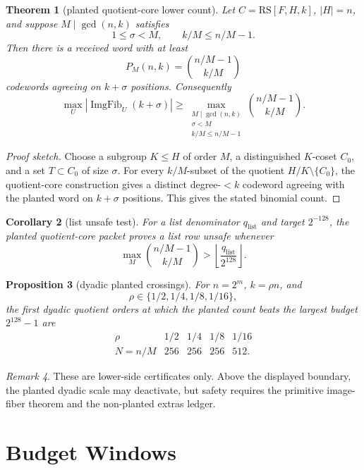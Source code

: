 \documentclass[11pt]{article}
\newtheorem{theorem}{Theorem}[section]
\newtheorem{proposition}[theorem]{Proposition}
\newtheorem{corollary}[theorem]{Corollary}
\theoremstyle{definition}
\theoremstyle{remark}
\newtheorem{remark}[theorem]{Remark}
\newcommand{\RS}{\mathrm{RS}}
\newcommand{\ImgFib}{\operatorname{ImgFib}}
\newcommand{\floor}[1]{\left\lfloor #1\right\rfloor}
\begin{document}
\begin{theorem}[planted quotient-core lower count]\label{thm:planted}
Let $C=\RS[F,H,k]$, $|H|=n$, and suppose $M\mid\gcd(n,k)$ satisfies
\[
        1\le \sigma<M,\qquad k/M\le n/M-1.
\]
Then there is a received word with at least
\[
        P_M(n,k)=\binom{n/M-1}{k/M}
\]
codewords agreeing on $k+\sigma$ positions.  Consequently
\[
\max_U |\ImgFib_U(k+\sigma)|
\ge
\max_{\substack{M\mid\gcd(n,k)\\ \sigma<M\\ k/M\le n/M-1}}
\binom{n/M-1}{k/M}.
\]
\end{theorem}

\begin{proof}[Proof sketch]
Choose a subgroup $K\le H$ of order $M$, a distinguished $K$-coset $C_0$, and
a set $T\subset C_0$ of size $\sigma$.  For every $k/M$-subset of the quotient
$H/K\setminus\{C_0\}$, the quotient-core construction gives a distinct
degree-$<k$ codeword agreeing with the planted word on $k+\sigma$ positions.
This gives the stated binomial count.
\end{proof}

\begin{corollary}[list unsafe test]\label{cor:list-unsafe}
For a list denominator $q_{\mathrm{list}}$ and target $2^{-128}$, the planted
quotient-core packet proves a list row unsafe whenever
\[
\max_M\binom{n/M-1}{k/M}>
\floor{\frac{q_{\mathrm{list}}}{2^{128}}}.
\]
\end{corollary}

\begin{proposition}[dyadic planted crossings]\label{prop:dyadic}
For $n=2^m$, $k=\rho n$, and
\[
        \rho\in\{1/2,1/4,1/8,1/16\},
\]
the first dyadic quotient orders at which the planted count beats the largest
budget $2^{128}-1$ are
\[
\begin{array}{c|cccc}
\rho & 1/2 & 1/4 & 1/8 & 1/16\\ \hline
N=n/M & 256 & 256 & 256 & 512 .
\end{array}
\]
\end{proposition}

\begin{remark}
These are lower-side certificates only.  Above the displayed boundary, the
planted dyadic scale may deactivate, but safety requires the primitive
image-fiber theorem and the non-planted extras ledger.
\end{remark}

\section{Budget Windows}
\end{document}
